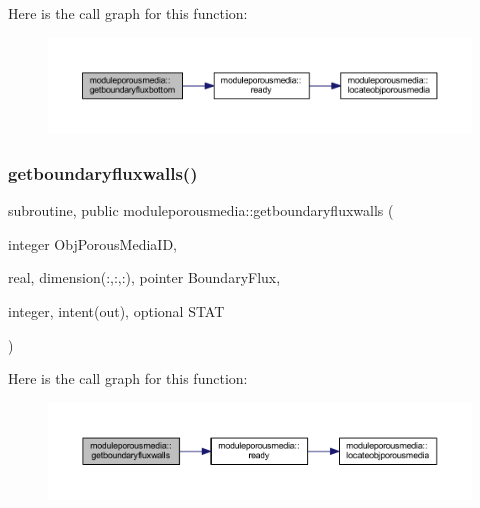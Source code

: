 Here is the call graph for this function\+:\nopagebreak
\begin{figure}[H]
\begin{center}
\leavevmode
\includegraphics[width=350pt]{namespacemoduleporousmedia_ad1e02ec3a85b11609df54fd2e561da0d_cgraph}
\end{center}
\end{figure}
\mbox{\label{namespacemoduleporousmedia_a50641f9d2c506813ba712d8f3ba6438d}} 
\subsubsection{\texorpdfstring{getboundaryfluxwalls()}{getboundaryfluxwalls()}}
{\footnotesize\ttfamily subroutine, public moduleporousmedia\+::getboundaryfluxwalls (\begin{DoxyParamCaption}\item[{integer}]{Obj\+Porous\+Media\+ID,  }\item[{real, dimension(\+:,\+:,\+:), pointer}]{Boundary\+Flux,  }\item[{integer, intent(out), optional}]{S\+T\+AT }\end{DoxyParamCaption})}

Here is the call graph for this function\+:\nopagebreak
\begin{figure}[H]
\begin{center}
\leavevmode
\includegraphics[width=350pt]{namespacemoduleporousmedia_a50641f9d2c506813ba712d8f3ba6438d_cgraph}
\end{center}
\end{figure}
\mbox{\label{namespacemoduleporousmedia_a7ef0de747f82c7f61108e9f6033b260d}} 
